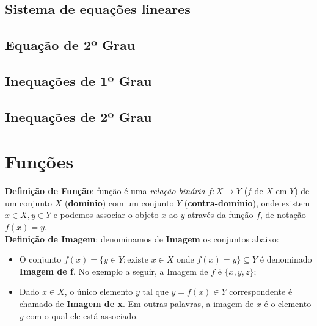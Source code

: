 \documentclass[13pt,letterpaper]{article}
\begin{document}
\subsection{Sistema de equações lineares}

\subsection{Equação de 2º Grau}

\subsection{Inequações de 1º Grau}

\subsection{Inequações de 2º Grau}

\section{Funções}
\textbf{Definição de Função}: função é uma \emph{relação binária} $f: X \rightarrow Y$ ($f$ de $X$ em $Y$) de um conjunto $X$ (\textbf{domínio}) com um conjunto $Y$ (\textbf{contra-domínio}), onde existem $x \in X, y \in Y$ e podemos associar o objeto $x$ ao $y$ através da função $f$, de notação $f(x) = y$. \\
\textbf{Definição de Imagem}: denominamos de \textbf{Imagem} os conjuntos abaixo:
\begin{itemize}
    \item O conjunto $f(x) = \{y \in Y; \text{existe } x \in X \text{ onde } f(x) = y \} \subseteq Y$ é denominado \textbf{Imagem de f}. No exemplo a seguir, a Imagem de $f$ é $\{x, y, z \}$;
    \item Dado $x \in X$, o único elemento $y$ tal que $y = f(x) \in Y$ correspondente é chamado de \textbf{Imagem de x}. Em outras palavras, a imagem de $x$ é o elemento $y$ com o qual ele está associado. 
\end{itemize}
\end{document}
